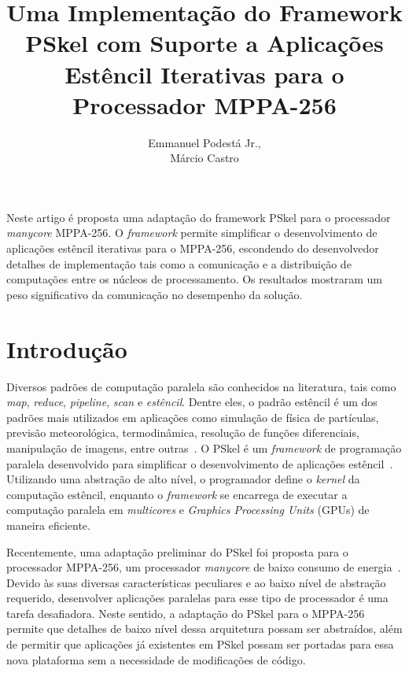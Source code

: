 \documentclass[12pt]{article}
\title{Uma Implementação do Framework PSkel com Suporte a Aplicações Estêncil
Iterativas para o Processador MPPA-256}
\author{Emmanuel Podestá Jr.\inst{1},\\Márcio Castro\inst{1}}
\newcommand{\fw}{\textit{framework}\xspace}
\newcommand{\pskel}{\small \textsf{PSkel}\xspace}
\newcommand{\mppa}{\small \textsf{MPPA-256}\xspace}
\begin{document}
\maketitle

%

\begin{resumo}
Neste artigo é proposta uma adaptação do framework PSkel para o processador
\textit{manycore} \mppa. O \fw permite simplificar o desenvolvimento de
aplicações estêncil iterativas para o \mppa, escondendo do desenvolvedor
detalhes de implementação tais como a comunicação e a distribuição de
computações entre os núcleos de processamento. Os resultados mostraram um peso
significativo da comunicação no desempenho da solução.
\end{resumo}

\section{Introdução}

Diversos padrões de computação paralela são conhecidos na literatura, tais como
\textit{map}, \textit{reduce}, \textit{pipeline}, \textit{scan} e
\textit{estêncil}. Dentre eles, o padrão estêncil é um dos padrões mais
utilizados em aplicações como simulação de física de partículas, previsão
meteorológica, termodinâmica, resolução de funções diferenciais, manipulação de
imagens, entre outras~\cite{Rahman:2011:USC:2016604.2016641}. O \pskel é um \fw
de programação paralela desenvolvido para simplificar o desenvolvimento de
aplicações estêncil~\cite{pereira15}. Utilizando uma abstração de alto nível, o
programador define o \emph{kernel} da computação estêncil, enquanto o \fw se
encarrega de executar a computação paralela em \textit{multicores} e
\textit{Graphics Processing Units} (GPUs) de maneira eficiente.

Recentemente, uma adaptação preliminar do \pskel foi proposta para o processador
\mppa, um processador \textit{manycore} de baixo consumo de
energia~\cite{Castro-Podesta-ERAD:2016}. Devido às suas diversas características
peculiares e ao baixo nível de abstração requerido, desenvolver aplicações
paralelas para esse tipo de processador é uma tarefa desafiadora. Neste sentido,
a adaptação do \pskel para o \mppa permite que detalhes de baixo nível dessa
arquitetura possam ser abstraídos, além de permitir que aplicações já existentes
em \pskel possam ser portadas para essa nova plataforma sem a necessidade de
modificações de código.
\end{document}
